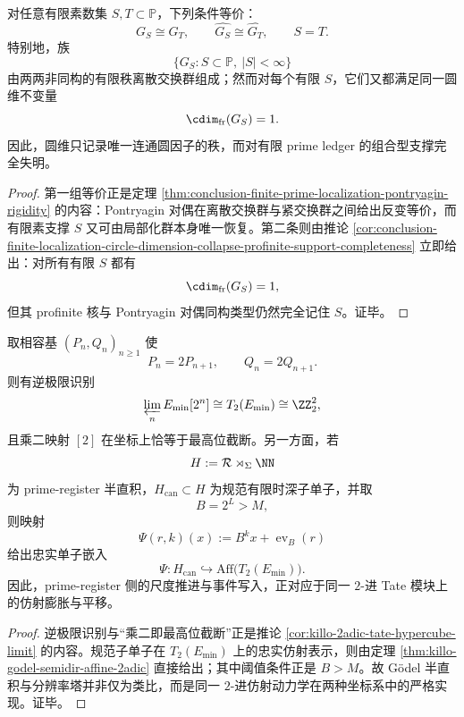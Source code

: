 \begin{corollary}\label{cor:conclusion-finite-primesupport-pontryagin-rigidity-circle-dimension-blindness}
对任意有限素数集 \(S,T\subset \mathbb P\)，下列条件等价：
\[
G_S\cong G_T,
\qquad
\widehat{G_S}\cong \widehat{G_T},
\qquad
S=T.
\]
特别地，族
\[
\{G_S:S\subset \mathbb P,\ |S|<\infty\}
\]
由两两非同构的有限秩离散交换群组成；然而对每个有限 \(S\)，它们又都满足同一圆维不变量
\[
\cdim_{\mathrm{fr}}(G_S)=1.
\]
因此，圆维只记录唯一连通圆因子的秩，而对有限 prime ledger 的组合型支撑完全失明。
\end{corollary}
\begin{proof}
第一组等价正是定理 \ref{thm:conclusion-finite-prime-localization-pontryagin-rigidity} 的内容：Pontryagin 对偶在离散交换群与紧交换群之间给出反变等价，而有限素支撑 \(S\) 又可由局部化群本身唯一恢复。第二条则由推论 \ref{cor:conclusion-finite-localization-circle-dimension-collapse-profinite-support-completeness} 立即给出：对所有有限 \(S\) 都有
\[
\cdim_{\mathrm{fr}}(G_S)=1,
\]
但其 profinite 核与 Pontryagin 对偶同构类型仍然完全记住 \(S\)。证毕。
\end{proof}

\begin{theorem}\label{thm:conclusion-godel-semidirect-twoadic-affineization}
取相容基 \((P_n,Q_n)_{n\ge 1}\) 使
\[
P_n=2P_{n+1},
\qquad
Q_n=2Q_{n+1}.
\]
则有逆极限识别
\[
\varprojlim_n E_{\min}[2^n]\cong T_2(E_{\min})\cong \ZZ_2^2,
\]
且乘二映射 \([2]\) 在坐标上恰等于最高位截断。另一方面，若
\[
H:=\mathcal R\rtimes_{\Sigma}\NN
\]
为 prime-register 半直积，\(H_{\mathrm{can}}\subset H\) 为规范有限时深子单子，并取
\[
B=2^L>M,
\]
则映射
\[
\Psi(r,k)(x):=B^k x+\operatorname{ev}_B(r)
\]
给出忠实单子嵌入
\[
\Psi:H_{\mathrm{can}}\hookrightarrow \mathrm{Aff}\!\bigl(T_2(E_{\min})\bigr).
\]
因此，prime-register 侧的尺度推进与事件写入，正对应于同一 \(2\)-进 Tate 模块上的仿射膨胀与平移。
\end{theorem}
\begin{proof}
逆极限识别与“乘二即最高位截断”正是推论 \ref{cor:killo-2adic-tate-hypercube-limit} 的内容。规范子单子在 \(T_2(E_{\min})\) 上的忠实仿射表示，则由定理 \ref{thm:killo-godel-semidir-affine-2adic} 直接给出；其中阈值条件正是 \(B>M\)。故 Gödel 半直积与分辨率塔并非仅为类比，而是同一 \(2\)-进仿射动力学在两种坐标系中的严格实现。证毕。
\end{proof}

